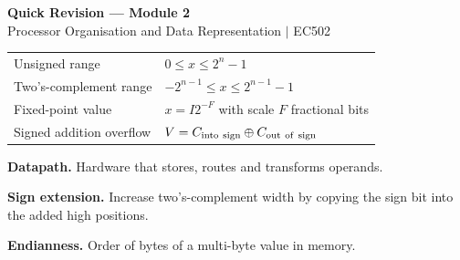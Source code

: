 \documentclass[12pt,a4paper]{article}
\renewcommand{\arraystretch}{1.45}
\begin{document}
\newpage
\begin{center}
  {\large\bfseries\color{myred} Quick Revision --- Module 2}\\[3pt]
  {\small\color{mydark} Processor Organisation and Data Representation $|$ EC502}
\end{center}
\noindent{\color{myred}\rule{\linewidth}{1.2pt}}
\begin{tcolorbox}[formulabox,title={Key Formulas at a Glance}]
\renewcommand{\arraystretch}{1.35}
\begin{tabularx}{\linewidth}{B{5.0cm}Y}
Unsigned range & $0\le x\le 2^n-1$ \\[3pt]
Two's-complement range & $-2^{n-1}\le x\le 2^{n-1}-1$ \\[3pt]
Fixed-point value & $x=I2^{-F}$ with scale $F$ fractional bits \\[3pt]
Signed addition overflow & $V=C_{\rm into\ sign}\oplus C_{\rm out\ of\ sign}$ \\[3pt]
\end{tabularx}
\end{tcolorbox}
\begin{tcolorbox}[defbox,title={One-Line Definitions}]
\textbf{Datapath.} Hardware that stores, routes and transforms operands.\par
\textbf{Sign extension.} Increase two's-complement width by copying the sign bit into the added high positions.\par
\textbf{Endianness.} Order of bytes of a multi-byte value in memory.\par
\end{tcolorbox}
\end{document}
